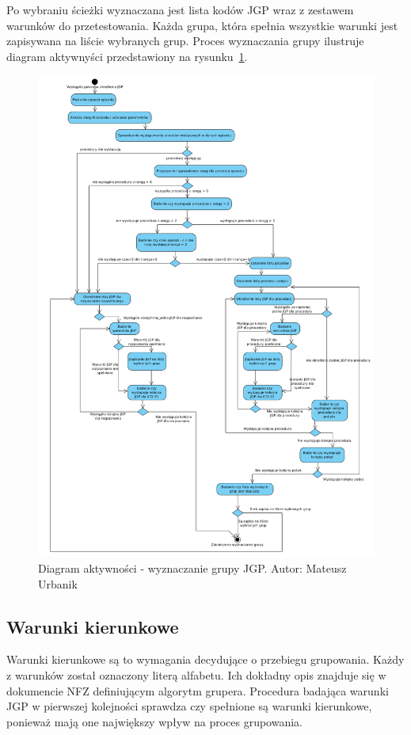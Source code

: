 Po wybraniu ścieżki wyznaczana jest lista kodów JGP wraz z zestawem warunków do przetestowania. Każda grupa, która spełnia wszystkie warunki jest zapisywana na liście wybranych grup. Proces wyznaczania grupy ilustruje diagram aktywnyści przedstawiony na rysunku~\ref{img:diagram_activity_jgp}.
\newpage
\begin{figure}[!ht]
\centering
\includegraphics[scale=0.4]{images/activity-jgp} 
\caption[Diagram aktywności]{Diagram aktywności - wyznaczanie grupy JGP. Autor: Mateusz Urbanik}
\label{img:diagram_activity_jgp}
\end{figure}

\subsection{Warunki kierunkowe}
\label{sec:warunkiKierunkowe}
Warunki kierunkowe są to wymagania decydujące o przebiegu grupowania. Każdy z warunków został oznaczony literą alfabetu. Ich dokładny opis znajduje się w dokumencie NFZ definiującym algorytm grupera\cite{algorytm_grupera}. Procedura badająca warunki JGP w pierwszej kolejności sprawdza czy spełnione są warunki kierunkowe, ponieważ mają one największy wpływ na proces grupowania.

